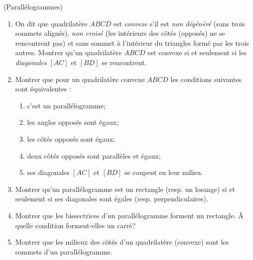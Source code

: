 \documentclass[a4paper,11pt,reqno]{amsart}
\begin{document}
\begin{exo} (Parallélogrammes) %

  \begin{enumerate}
    \item On dit que quadrilatère $ABCD$ est \emph{convexe} s'il est \emph{non dégénéré} (sans trois sommets alignés), \emph{non croisé} (les intérieurs des côtés (opposés) ne se rencontrent pas) et sans sommet à l'intérieur du triangles formé par les trois autres. Montrer qu'un quadrilatère $ABCD$ est convexe si et seulement si les \emph{diagonales} $[AC]$ et $[BD]$ se rencontrent.
    \item Montrer que pour un quadrilatère convexe $ABCD$ les conditions suivantes sont équivalentes :
    \begin{enumerate}
      \item c'est un parallélogramme;
      \item les angles opposés sont égaux;
      \item les côtés opposés sont égaux;
      \item deux côtés opposés sont parallèles et égaux;
      \item ses diagonales $[AC]$ et $[BD]$ se coupent en leur milieu.
    \end{enumerate}
    \item Montrer qu'un parallélogramme est un rectangle (resp. un losange) si et seulement si ses diagonales sont égales (resp. perpendiculaires).
    \item Montrer que les bissectrices d'un parallélogramme forment un rectangle. À quelle condition forment-elles un carré?
    \item Montrer que les milieux des côtés d'un quadrilatère (convexe) sont les sommets d'un parallélogramme.
  \end{enumerate}
\end{exo}
\end{document}
